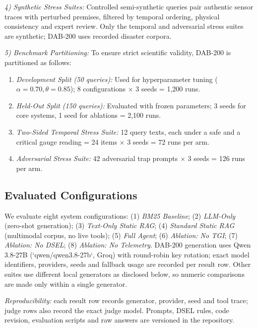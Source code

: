 \documentclass[conference]{IEEEtran}
\begin{document}
\textit{4) Synthetic Stress Suites:} Controlled semi-synthetic queries pair authentic sensor traces with perturbed premises, filtered by temporal ordering, physical consistency and expert review. Only the temporal and adversarial stress suites are synthetic; DAB-200 uses recorded disaster corpora.

\textit{5) Benchmark Partitioning:} To ensure strict scientific validity, DAB-200 is partitioned as follows:
\begin{enumerate}
    \item \textit{Development Split (50 queries):} Used for hyperparameter tuning ($\alpha = 0.70, \theta = 0.85$); 8 configurations $\times$ 3 seeds = 1,200 runs.
    \item \textit{Held-Out Split (150 queries):} Evaluated with frozen parameters; 3 seeds for core systems, 1 seed for ablations = 2,100 runs.
    \item \textit{Two-Sided Temporal Stress Suite:} 12 query texts, each under a safe and a critical gauge reading = 24 items $\times$ 3 seeds = 72 runs per arm.
    \item \textit{Adversarial Stress Suite:} 42 adversarial trap prompts $\times$ 3 seeds = 126 runs per arm.
\end{enumerate}

\subsection{Evaluated Configurations}
We evaluate eight system configurations: (1) \textit{BM25 Baseline}; (2) \textit{LLM-Only} (zero-shot generation); (3) \textit{Text-Only Static RAG}; (4) \textit{Standard Static RAG} (multimodal corpus, no live tools); (5) \textit{Full Agent}; (6) \textit{Ablation: No TGI}; (7) \textit{Ablation: No DSEL}; (8) \textit{Ablation: No Telemetry}. DAB-200 generation uses Qwen 3.8-27B (`qwen/qwen3.8-27b`, Groq) with round-robin key rotation; exact model identifiers, providers, seeds and fallback usage are recorded per result row. Other suites use different local generators as disclosed below, so numeric comparisons are made only within a single generator.

\textit{Reproducibility:} each result row records generator, provider, seed and tool trace; judge rows also record the exact judge model. Prompts, DSEL rules, code revision, evaluation scripts and raw answers are versioned in the repository.
\end{document}
